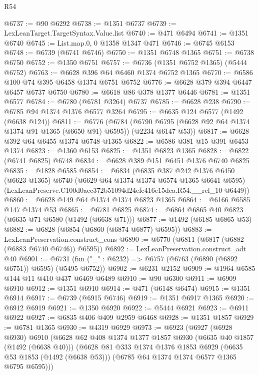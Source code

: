 \begin{lexlean}{R54}
\begin{coremodule}
@6737 := @90 @6292
@6738 := @1351 @6737
@6739 := LexLeanTarget.TargetSyntax.Value.list
@6740 := @471 @6494
@6741 := @1351 @6740
@6745 := List.map.{0, 0} @1358 @1347 @471
@6746 := @6745 @6153
@6748 := @6739 (@6741 @6746)
@6750 := @1351 @6748 @1365
@6751 := @6738 @6750
@6752 := @1350 @6751
@6757 := @6736 (@1351 @6752 @1365) (@5444 @6752)
@6763 := @6628 @396 @64 @6460 @1374 @6752 @1365
@6770 := @6586 @100 @74 @395 @6458 @1374 @6751 @6752
@6776 := @6628 @379 @394 @6447 @6457 @6737 @6750
@6780 := @6618 @86 @378 @1377 @6446
@6781 := @1351 @6577
@6784 := @6780 (@6781 @3264) @6737
@6785 := @6628 @238
@6790 := @6785 @94 @1374 @1376 @6577 @3264
@6795 := @6635 @124 @6577 (@1492 (@6638 @124))
@6811 := @6776
    (@6784 (@6790 @6795 (@6628 @92 @64 @1374 @1374 @91 @1365 (@6650 @91) @6595)) (@2234 @6147 @53))
@6817 := @6628 @392 @64 @6455 @1374 @6748 @1365
@6822 := @6586 @381 @15 @391 @6453 @1374
@6823 := @1360 @6153
@6825 := @1351 @6823 @1365
@6828 := @6822 (@6741 @6825) @6748
@6834 := @6628 @389 @151 @6451 @1376 @6740 @6825
@6835 := @1828 @6585
@6854 := @6834
    (@6835
      @387
      @242
      @1376
      @6450
      (@6623 @1365)
      @6740
      (@6629 @64 @1374 @1374 @6574 @1365 @6641 @6595)
      (LexLeanPreserve.C100d0aec372b51094d24efe416e15dca.R54.__rel_10 @6449))
@6860 := @6628 @149 @64 @1374 @1374 @6823 @1365
@6864 := @6166 @6585 @147 @1374 @53
@6865 := @6781 @6825
@6874 := @6864 @6865 @40 @6823 (@6635 @71 @6580 (@1492 (@6638 @71)))
@6877 := @1492 (@6185 @6865 @53)
@6882 := @6828 (@6854 (@6860 (@6874 @6877) @6595))
@6883 := LexLeanPreservation.construct_cons
@6890 := @6770 (@6811 (@6817 (@6882 (@6883 @6740 @6746)) @6595))
@6892 := LexLeanPreservation.construct_adt @40
@6901 := @6731 (fun ("_" : @6232) => @6757 (@6763 (@6890 (@6892 @6751)) @6595) (@5495 @6752))
@6902 := @6231 @2152
@6909 := @1964 @6585 @144 @11 @410 @437 @6469 @6489
@6910 := @90 @6300
@6911 := @6909 @6910
@6912 := @1351 @6910
@6914 := @471 (@6148 @6474)
@6915 := @1351 @6914
@6917 := @6739 (@6915 @6746)
@6919 := @1351 @6917 @1365
@6920 := @6912 @6919
@6921 := @1350 @6920
@6922 := @5444 @6921
@6923 := @6911 @6922
@6927 := @6835 @406 @409 @2959 @6468
@6928 := @1351 @1857
@6929 := @6781 @1365
@6930 := @4319 @6929
@6973 := @6923
    (@6927
      (@6928 @6930)
      @6910
      (@6628
        @62
        @408
        @1374
        @1377
        @1857
        @6930
        (@6635 @40 @1857 (@1492 (@6638 @40)))
        (@6628
          @81
          @333
          @1374
          @1376
          @1853
          @6929
          (@6635 @53 @1853 (@1492 (@6638 @53)))
          (@6785 @64 @1374 @1374 @6577 @1365 @6795 @6595)))

\end{coremodule}
\end{lexlean}
